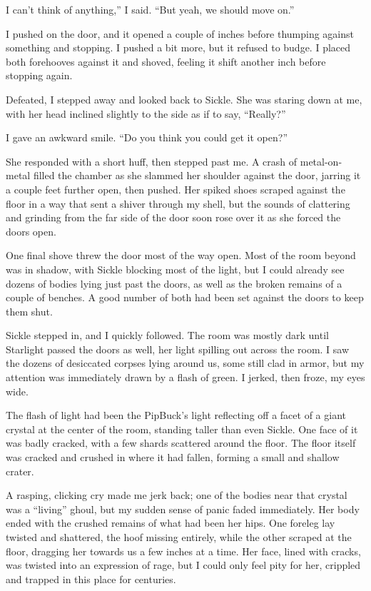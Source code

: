 \leavevmode{}I can’t think of anything,” I said. “But yeah, we should move on.”

I pushed on the door, and it opened a couple of inches before thumping against something and stopping. I pushed a bit more, but it refused to budge. I placed both forehooves against it and shoved, feeling it shift another inch before stopping again.

Defeated, I stepped away and looked back to Sickle. She was staring down at me, with her head inclined slightly to the side as if to say, “Really?”

I gave an awkward smile. “Do you think you could get it open?”

She responded with a short huff, then stepped past me. A crash of metal-on-metal filled the chamber as she slammed her shoulder against the door, jarring it a couple feet further open, then pushed. Her spiked shoes scraped against the floor in a way that sent a shiver through my shell, but the sounds of clattering and grinding from the far side of the door soon rose over it as she forced the doors open.

One final shove threw the door most of the way open. Most of the room beyond was in shadow, with Sickle blocking most of the light, but I could already see dozens of bodies lying just past the doors, as well as the broken remains of a couple of benches. A good number of both had been set against the doors to keep them shut.

Sickle stepped in, and I quickly followed. The room was mostly dark until Starlight passed the doors as well, her light spilling out across the room. I saw the dozens of desiccated corpses lying around us, some still clad in armor, but my attention was immediately drawn by a flash of green. I jerked, then froze, my eyes wide.

The flash of light had been the PipBuck’s light reflecting off a facet of a giant crystal at the center of the room, standing taller than even Sickle. One face of it was badly cracked, with a few shards scattered around the floor. The floor itself was cracked and crushed in where it had fallen, forming a small and shallow crater.

A rasping, clicking cry made me jerk back; one of the bodies near that crystal was a “living” ghoul, but my sudden sense of panic faded immediately. Her body ended with the crushed remains of what had been her hips. One foreleg lay twisted and shattered, the hoof missing entirely, while the other scraped at the floor, dragging her towards us a few inches at a time. Her face, lined with cracks, was twisted into an expression of rage, but I could only feel pity for her, crippled and trapped in this place for centuries.

